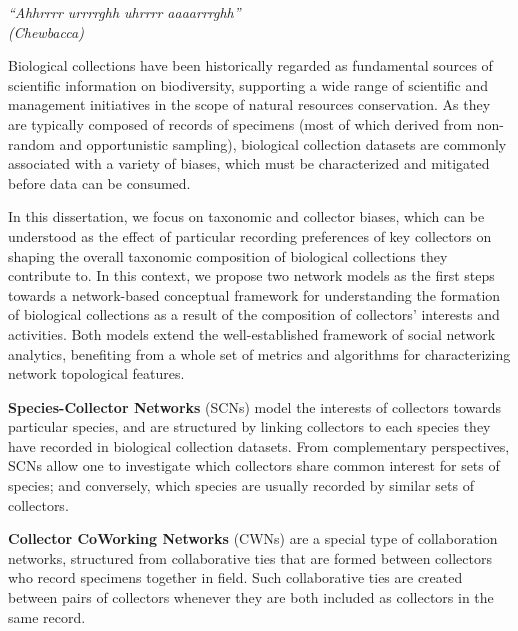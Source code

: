\documentclass[
	12pt,				%
	openright,			%
	oneside,			%
	a4paper,			%
	sumario=tradicional,%
	french,				%
	spanish,			%
	brazil,				%
    english
	]{abntex2}
\begin{document}
\begin{epigrafe}
    \vspace*{\fill}
	\begin{flushright}
		\textit{``Ahhrrrr urrrrghh uhrrrr aaaarrrghh''\\
		(Chewbacca)}
	\end{flushright}
\end{epigrafe}


\setlength{\absparsep}{18pt} %
\begin{resumo}
\begin{small}
Biological collections have been historically regarded as fundamental sources of scientific information on biodiversity, supporting a wide range of scientific and management initiatives in the scope of natural resources conservation. As they are typically composed of records of specimens (most of which derived from non-random and opportunistic sampling), biological collection datasets are commonly associated with a variety of biases, which must be characterized and mitigated before data can be consumed.

In this dissertation, we focus on taxonomic and collector biases, which can be understood as the effect of particular recording preferences of key collectors on shaping the overall taxonomic composition of biological collections they contribute to. In this context, we propose two network models as the first steps towards a network-based conceptual framework for understanding the formation of biological collections as a result of the composition of collectors' interests and activities. Both models extend the well-established framework of social network analytics, benefiting from a whole set of metrics and algorithms for characterizing network topological features.

\textbf{Species-Collector Networks} (SCNs) model the interests of collectors towards particular species, and are structured by linking collectors to each species they have recorded in biological collection datasets. From complementary perspectives, SCNs allow one to investigate which collectors share common interest for sets of species; and conversely, which species are usually recorded by similar sets of collectors.

\textbf{Collector CoWorking Networks} (CWNs) are a special type of collaboration networks, structured from collaborative ties  that are formed between collectors who record specimens together in field. Such collaborative ties are created between pairs of collectors whenever they are both included as collectors in the same record.


\end{small}
\end{resumo}
\end{document}

